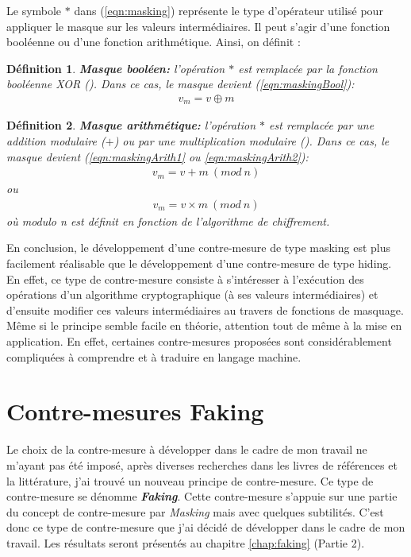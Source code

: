 \documentclass[oneside]{book}
\newtheorem{definition}{Définition}[section]
\begin{document}
\hspace{-0.5cm}Le symbole $*$ dans (\ref{eqn:masking}) représente le type d'opérateur utilisé pour appliquer le masque sur les valeurs intermédiaires. Il peut s'agir d'une fonction booléenne ou d'une fonction arithmétique. Ainsi, on définit : 

\theoremstyle{definition}
\begin{definition}{\textbf{Masque booléen:}}
l'opération $*$ est remplacée par la fonction booléenne XOR (\oplus). Dans ce cas, le masque devient (\ref{eqn:maskingBool}):
\begin{gather}
	v_m = v \oplus m\label{eqn:maskingBool}
\end{gather}
\end{definition}
\theoremstyle{definition}
\begin{definition}{\textbf{Masque arithmétique:}}
l'opération $*$ est remplacée par une addition modulaire ($+$) ou par une multiplication modulaire (\times ). Dans ce cas, le masque devient (\ref{eqn:maskingArith1} ou \ref{eqn:maskingArith2}): 
\begin{gather}
	v_m = v + m \ (mod \ n)\label{eqn:maskingArith1}
\end{gather}
ou
\begin{gather}
	v_m = v \times m \ (mod \ n)\label{eqn:maskingArith2}
\end{gather}
où \textit{modulo n} est définit en fonction de l'algorithme de chiffrement.
\end{definition}

En conclusion, le développement d'une contre-mesure de type masking est plus facilement réalisable que le développement d'une contre-mesure de type hiding. En effet, ce type de contre-mesure consiste à s'intéresser à l'exécution des opérations d'un algorithme cryptographique (à ses valeurs intermédiaires) et d'ensuite modifier ces valeurs intermédiaires au travers de fonctions de masquage. Même si le principe semble facile en théorie, attention tout de même à la mise en application. En effet, certaines contre-mesures proposées sont considérablement compliquées à comprendre et à traduire en langage machine.

\section{Contre-mesures Faking}
\label{sec:faking}

Le choix de la contre-mesure à développer dans le cadre de mon travail ne m'ayant pas été imposé, après diverses recherches dans les livres de références et la littérature, j'ai trouvé un nouveau principe de contre-mesure. Ce type de contre-mesure se dénomme \textbf{\textit{Faking}}. Cette contre-mesure s'appuie sur une partie du concept de contre-mesure par \textit{Masking} mais avec quelques subtilités. C'est donc ce type de contre-mesure que j'ai décidé de développer dans le cadre de mon travail. Les résultats seront présentés au chapitre \ref{chap:faking} (Partie 2).
\end{document}
